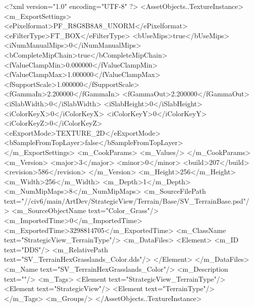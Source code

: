 <?xml version="1.0" encoding="UTF-8" ?>
<AssetObjects..TextureInstance>
	<m_ExportSettings>
		<ePixelformat>PF_R8G8B8A8_UNORM</ePixelformat>
		<eFilterType>FT_BOX</eFilterType>
		<bUseMips>true</bUseMips>
		<iNumManualMips>0</iNumManualMips>
		<bCompleteMipChain>true</bCompleteMipChain>
		<fValueClampMin>0.000000</fValueClampMin>
		<fValueClampMax>1.000000</fValueClampMax>
		<fSupportScale>1.000000</fSupportScale>
		<fGammaIn>2.200000</fGammaIn>
		<fGammaOut>2.200000</fGammaOut>
		<iSlabWidth>0</iSlabWidth>
		<iSlabHeight>0</iSlabHeight>
		<iColorKeyX>0</iColorKeyX>
		<iColorKeyY>0</iColorKeyY>
		<iColorKeyZ>0</iColorKeyZ>
		<eExportMode>TEXTURE_2D</eExportMode>
		<bSampleFromTopLayer>false</bSampleFromTopLayer>
	</m_ExportSettings>
	<m_CookParams>
		<m_Values/>
	</m_CookParams>
	<m_Version>
		<major>3</major>
		<minor>0</minor>
		<build>207</build>
		<revision>586</revision>
	</m_Version>
	<m_Height>256</m_Height>
	<m_Width>256</m_Width>
	<m_Depth>1</m_Depth>
	<m_NumMipMaps>8</m_NumMipMaps>
	<m_SourceFilePath text="//civ6/main/ArtDev/StrategicView/Terrain/Base/SV_TerrainBase.psd"/>
	<m_SourceObjectName text="Color_Grass"/>
	<m_ImportedTime>0</m_ImportedTime>
	<m_ExportedTime>3298814705</m_ExportedTime>
	<m_ClassName text="StrategicView_TerrainType"/>
	<m_DataFiles>
		<Element>
			<m_ID text="DDS"/>
			<m_RelativePath text="SV_TerrainHexGrasslands_Color.dds"/>
		</Element>
	</m_DataFiles>
	<m_Name text="SV_TerrainHexGrasslands_Color"/>
	<m_Description text=""/>
	<m_Tags>
		<Element text="StrategicView_TerrainType"/>
		<Element text="StrategicView"/>
		<Element text="TerrainType"/>
	</m_Tags>
	<m_Groups/>
</AssetObjects..TextureInstance>

